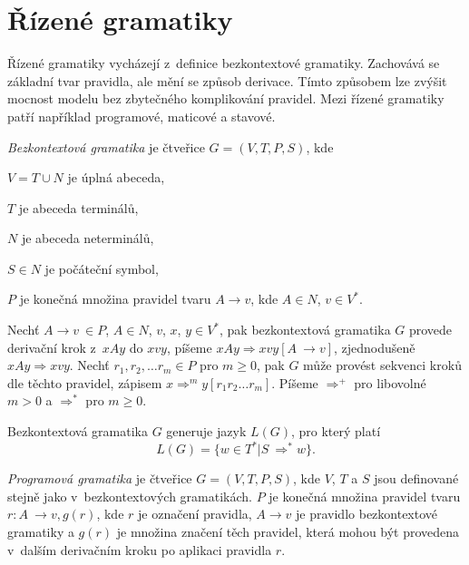 \section{Řízené gramatiky}

Řízené gramatiky vycházejí z~definice bezkontextové gramatiky. Zachovává se základní tvar pravidla, ale mění se způsob derivace. Tímto způsobem lze zvýšit mocnost modelu bez zbytečného komplikování pravidel. Mezi řízené gramatiky patří například programové, maticové a stavové.  

\begin{Def}\label{def_bezkontext_gram}

\emph{Bezkontextová gramatika} \cite{Krivka:RewritingSystems} je čtveřice $G = (V,T,P,S)$, kde 
\begin{description*}
\item $V = T \cup N$ je úplná abeceda, 
\item $T$ je abeceda terminálů, 
\item $N$ je abeceda neterminálů, 
\item $S \in N$ je počáteční symbol, 
\item $P$ je konečná množina pravidel tvaru $A \rightarrow v$, kde $A \in N$, $v \in V^*$.
\end{description*}
Nechť $A \rightarrow v~\in P$, $A \in N$, $v$, $x$, $y \in V^*$, pak bezkontextová gramatika $G$ provede derivační krok z~$xAy$ do $xvy$, píšeme $xAy \Rightarrow xvy [A~\rightarrow v]$, zjednodušeně $xAy \Rightarrow xvy$. 
Nechť $r_1, r_2, \dots r_m \in P$ pro $m \ge 0$, pak $G$ může provést sekvenci kroků dle těchto pravidel, zápisem $x {\Rightarrow}^m y [r_1 r_2 \dots r_m]$. Píšeme ${\Rightarrow}^+$ pro libovolné $m > 0$ a ${\Rightarrow}^*$ pro $m \ge 0$. 

Bezkontextová gramatika $G$ generuje jazyk $L(G)$, pro který platí $$L(G) = \{w \in T^* | S~{\Rightarrow}^* w\}.$$ 

\end{Def}

\begin{Def}
\emph{Programová gramatika} \cite{Krivka:RewritingSystems} je čtveřice $G = (V,T,P,S)$, kde $V$, $T$ a $S$ jsou definované stejně jako v~bezkontextových gramatikách. $P$ je konečná množina pravidel tvaru $r \colon A~\rightarrow v, g(r)$, kde $r$ je označení pravidla, $A \rightarrow v$ je pravidlo bezkontextové gramatiky a $g(r)$ je množina značení těch pravidel, která mohou být provedena v~dalším derivačním kroku po aplikaci pravidla $r$.
\end{Def}


